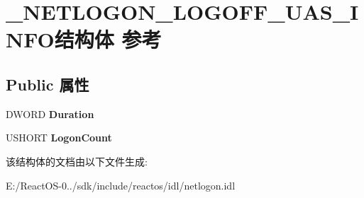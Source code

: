 \hypertarget{struct___n_e_t_l_o_g_o_n___l_o_g_o_f_f___u_a_s___i_n_f_o}{}\section{\+\_\+\+N\+E\+T\+L\+O\+G\+O\+N\+\_\+\+L\+O\+G\+O\+F\+F\+\_\+\+U\+A\+S\+\_\+\+I\+N\+F\+O结构体 参考}
\label{struct___n_e_t_l_o_g_o_n___l_o_g_o_f_f___u_a_s___i_n_f_o}
\subsection*{Public 属性}
\begin{DoxyCompactItemize}
\item 
\mbox{\label{struct___n_e_t_l_o_g_o_n___l_o_g_o_f_f___u_a_s___i_n_f_o_aad58849ae50b7310e229a86351763aff}} 
D\+W\+O\+RD {\bfseries Duration}
\item 
\mbox{\label{struct___n_e_t_l_o_g_o_n___l_o_g_o_f_f___u_a_s___i_n_f_o_a13ab844ba5a26d79ba4f7db90fa5825f}} 
U\+S\+H\+O\+RT {\bfseries Logon\+Count}
\end{DoxyCompactItemize}


该结构体的文档由以下文件生成\+:\begin{DoxyCompactItemize}
\item 
E\+:/\+React\+O\+S-\/0../sdk/include/reactos/idl/netlogon.\+idl\end{DoxyCompactItemize}
